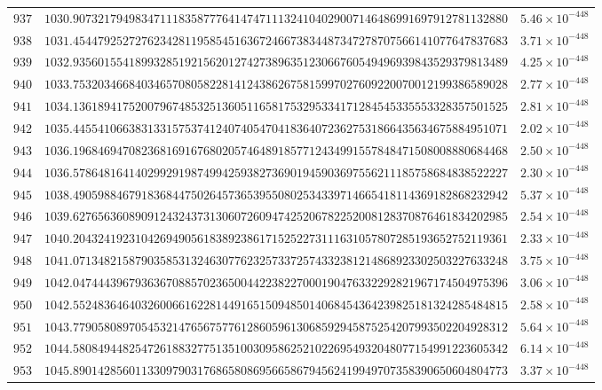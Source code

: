 \documentclass[12pt,reqno]{amsart}
\theoremstyle{remark}
\begin{document}
\begin{longtable}{clc}
$937$ & $1030.9073217949834711183587776414747111324104029007146486991697912781132880$ & $5.46\times 10^{-448}$ \\
$938$ & $1031.4544792527276234281195854516367246673834487347278707566141077647837683$ & $3.71\times 10^{-448}$ \\
$939$ & $1032.9356015541899328519215620127427389635123066760549496939843529379813489$ & $4.25\times 10^{-448}$ \\
$940$ & $1033.7532034668403465708058228141243862675815997027609220070012199386589028$ & $2.77\times 10^{-448}$ \\
$941$ & $1034.1361894175200796748532513605116581753295334171284545335553328357501525$ & $2.81\times 10^{-448}$ \\
$942$ & $1035.4455410663831331575374124074054704183640723627531866435634675884951071$ & $2.02\times 10^{-448}$ \\
$943$ & $1036.1968469470823681691676802057464891857712434991557848471508008880684468$ & $2.50\times 10^{-448}$ \\
$944$ & $1036.5786481641402992919874994259382736901945903697556211185758684838522227$ & $2.30\times 10^{-448}$ \\
$945$ & $1038.4905988467918368447502645736539550802534339714665418114369182868232942$ & $5.37\times 10^{-448}$ \\
$946$ & $1039.6276563608909124324373130607260947425206782252008128370876461834202985$ & $2.54\times 10^{-448}$ \\
$947$ & $1040.2043241923104269490561838923861715252273111631057807285193652752119361$ & $2.33\times 10^{-448}$ \\
$948$ & $1041.0713482158790358531324630776232573372574332381214868923302503227633248$ & $3.75\times 10^{-448}$ \\
$949$ & $1042.0474443967936367088570236500442238227000190476332292821967174504975396$ & $3.06\times 10^{-448}$ \\
$950$ & $1042.5524836464032600661622814491651509485014068454364239825181324285484815$ & $2.58\times 10^{-448}$ \\
$951$ & $1043.7790580897054532147656757761286059613068592945875254207993502204928312$ & $5.64\times 10^{-448}$ \\
$952$ & $1044.5808494482547261883277513510030958625210226954932048077154991223605342$ & $6.14\times 10^{-448}$ \\
$953$ & $1045.8901428560113309790317686580869566586794562419949707358390650604804773$ & $3.37\times 10^{-448}$ \\

\end{longtable}
\end{document}
